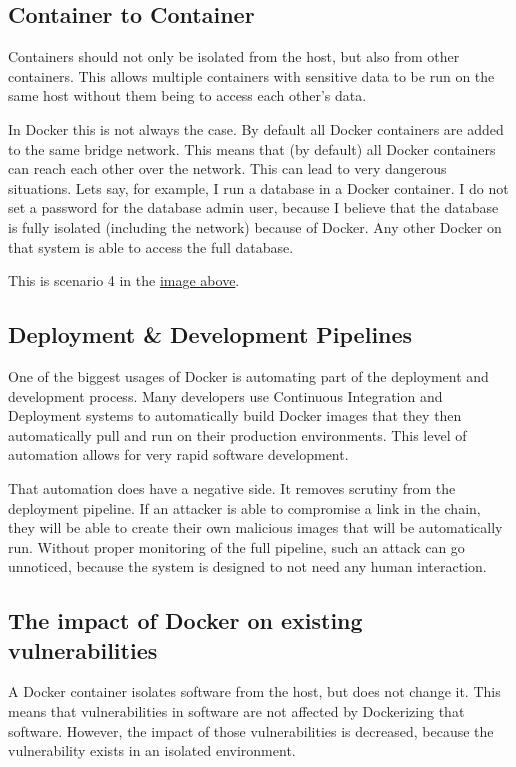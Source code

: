 \subsection{Container to Container}
Containers should not only be isolated from the host, but also from other containers. This allows multiple containers with sensitive data to be run on the same host without them being to access each other's data.

In Docker this is not always the case. By default all Docker containers are added to the same bridge network. This means that (by default) all Docker containers can reach each other over the network. This can lead to very dangerous situations. Lets say, for example, I run a database in a Docker container. I do not set a password for the database admin user, because I believe that the database is fully isolated (including the network) because of Docker. Any other Docker on that system is able to access the full database.

This is scenario 4 in the \href{fig:attacksurfaces}{image above}.

\subsection{Deployment \& Development Pipelines}
One of the biggest usages of Docker is automating part of the deployment and development process. Many developers use Continuous Integration and Deployment systems to automatically build Docker images that they then automatically pull and run on their production environments. This level of automation allows for very rapid software development.

That automation does have a negative side. It removes scrutiny from the deployment pipeline. If an attacker is able to compromise a link in the chain, they will be able to create their own malicious images that will be automatically run. Without proper monitoring of the full pipeline, such an attack can go unnoticed, because the system is designed to not need any human interaction.

\subsection{The impact of Docker on existing vulnerabilities}
A Docker container isolates software from the host, but does not change it. This means that vulnerabilities in software are not affected by Dockerizing that software. However, the impact of those vulnerabilities is decreased, because the vulnerability exists in an isolated environment.

